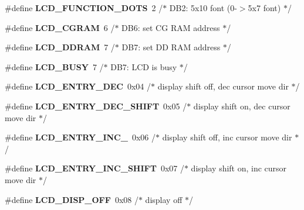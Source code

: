 \begin{DoxyCompactItemize}
\#define {\bfseries L\+C\+D\+\_\+\+F\+U\+N\+C\+T\+I\+O\+N\+\_\+D\+O\+TS}~2 /$\ast$   D\+B2\+: 5x10 font (0-\/$>$5x7 font)      $\ast$/
\item 
\mbox{\label{group__pfleury__lcd_ga3b38de74c362be1781fef1136aa9684c}} 
\#define {\bfseries L\+C\+D\+\_\+\+C\+G\+R\+AM}~6 /$\ast$ D\+B6\+: set CG R\+AM address             $\ast$/
\item 
\mbox{\label{group__pfleury__lcd_gae54acf3ccc45b7d6be334a03627740c6}} 
\#define {\bfseries L\+C\+D\+\_\+\+D\+D\+R\+AM}~7 /$\ast$ D\+B7\+: set DD R\+AM address             $\ast$/
\item 
\mbox{\label{group__pfleury__lcd_gac8dd1658e235f174d1cabae5c438943d}} 
\#define {\bfseries L\+C\+D\+\_\+\+B\+U\+SY}~7 /$\ast$ D\+B7\+: L\+CD is busy                    $\ast$/
\item 
\mbox{\label{group__pfleury__lcd_gaad56f8e07634e85663f56888ae97089c}} 
\#define {\bfseries L\+C\+D\+\_\+\+E\+N\+T\+R\+Y\+\_\+\+D\+EC}~0x04 /$\ast$ display shift off, dec cursor move dir $\ast$/
\item 
\mbox{\label{group__pfleury__lcd_ga1c62932f252c6262cbef728add9696e4}} 
\#define {\bfseries L\+C\+D\+\_\+\+E\+N\+T\+R\+Y\+\_\+\+D\+E\+C\+\_\+\+S\+H\+I\+FT}~0x05 /$\ast$ display shift on,  dec cursor move dir $\ast$/
\item 
\mbox{\label{group__pfleury__lcd_gad27ddc4b8d03594662c8757f946dde28}} 
\#define {\bfseries L\+C\+D\+\_\+\+E\+N\+T\+R\+Y\+\_\+\+I\+N\+C\+\_\+}~0x06 /$\ast$ display shift off, inc cursor move dir $\ast$/
\item 
\mbox{\label{group__pfleury__lcd_gafabd0215cc6ae5539dc638dbec44a506}} 
\#define {\bfseries L\+C\+D\+\_\+\+E\+N\+T\+R\+Y\+\_\+\+I\+N\+C\+\_\+\+S\+H\+I\+FT}~0x07 /$\ast$ display shift on,  inc cursor move dir $\ast$/
\item 
\mbox{\label{group__pfleury__lcd_gaa2966175115943883f51e9c90478540c}} 
\#define {\bfseries L\+C\+D\+\_\+\+D\+I\+S\+P\+\_\+\+O\+FF}~0x08 /$\ast$ display off                            $\ast$/

\end{DoxyCompactItemize}
